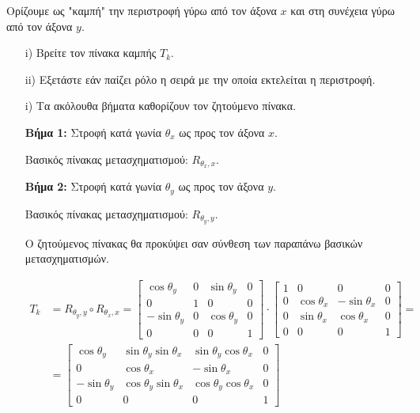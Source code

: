 \begin{example}
	Ορίζουμε ως "καμπή" την περιστροφή γύρω από τον άξονα \( x \) και στη συνέχεια γύρω από τον άξονα \( y \). 
	
	\begin{enumerate}
	    \item[i)] Βρείτε τον πίνακα καμπής \( T_k \).
  	    \item[ii)] Εξετάστε εάν παίζει ρόλο η σειρά με την οποία εκτελείται η περιστροφή.
	\end{enumerate}
\end{example}

\begin{solution}
	
\begin{enumerate}
	    \item[i)]   Τα ακόλουθα βήματα καθορίζουν τον ζητούμενο πίνακα.


\textbf{Βήμα 1:} Στροφή κατά γωνία \( \theta_x \) ως προς τον άξονα \( x \).

    Βασικός πίνακας μετασχηματισμού: \( R_{\theta_x, x} \).

\textbf{Βήμα 2:} Στροφή κατά γωνία \( \theta_y \) ως προς τον άξονα \( y \).

    Βασικός πίνακας μετασχηματισμού: \( R_{\theta_y, y} \).

    Ο ζητούμενος πίνακας θα προκύψει σαν σύνθεση των παραπάνω βασικών μετασχηματισμών.





\begin{align*}
T_k &= R_{\theta_y, y}  \circ R_{\theta_x, x} = 
		\begin{bmatrix}
		\cos \theta_y & 0 & \sin \theta_y & 0 \\
		0 & 1 & 0 & 0 \\
		-\sin \theta_y & 0 & \cos \theta_y & 0 \\
		0 & 0 & 0 & 1
		\end{bmatrix}
	\cdot 
		\begin{bmatrix}
		1 & 0 & 0 & 0 \\
		0 & \cos \theta_x & -\sin \theta_x & 0 \\
		0 & \sin \theta_x & \cos \theta_x & 0 \\
		0 & 0 & 0 & 1
		\end{bmatrix} = \\
	&= 
		\begin{bmatrix}
		\cos \theta_y & \sin \theta_y \sin \theta_x & \sin \theta_y \cos \theta_x & 0 \\
		0 & \cos \theta_x & -\sin \theta_x & 0 \\
		-\sin \theta_y & \cos \theta_y \sin \theta_x & \cos \theta_y \cos \theta_x & 0 \\
		0 & 0 & 0 & 1
		\end{bmatrix}
\end{align*}


\end{enumerate}
\end{solution}
